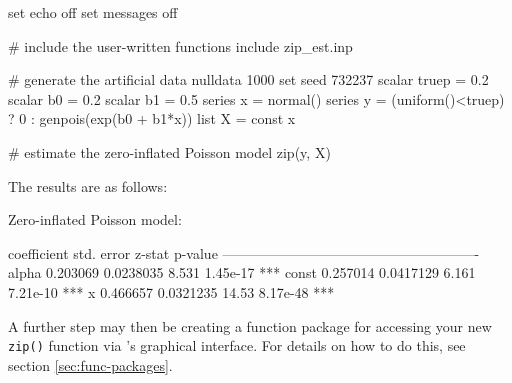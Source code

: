 \begin{code}
set echo off
set messages off

# include the user-written functions
include zip_est.inp

# generate the artificial data
nulldata 1000
set seed 732237
scalar truep = 0.2
scalar b0 = 0.2
scalar b1 = 0.5
series x = normal()
series y = (uniform()<truep) ? 0 : genpois(exp(b0 + b1*x))
list X = const x

# estimate the zero-inflated Poisson model
zip(y, X)
\end{code}

The results are as follows:

\begin{code}
Zero-inflated Poisson model:

             coefficient   std. error   z-stat   p-value 
  -------------------------------------------------------
  alpha       0.203069     0.0238035     8.531   1.45e-17 ***
  const       0.257014     0.0417129     6.161   7.21e-10 ***
  x           0.466657     0.0321235    14.53    8.17e-48 ***
\end{code}

A further step may then be creating a function package for accessing
your new \texttt{zip()} function via 's graphical interface. For
details on how to do this, see section \ref{sec:func-packages}.


